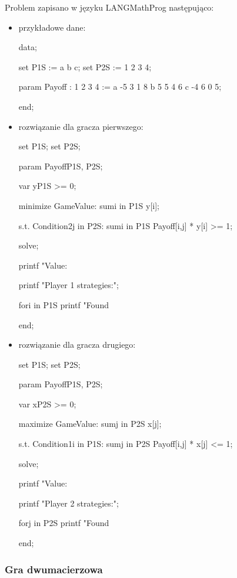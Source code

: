 \documentclass[polish]{standalone}
\begin{document}
Problem zapisano w języku LANG{MathProg} następująco:
\begin{itemize}
\item przykładowe dane:
\begin{code}
data;
 
set P1S := a b c;
set P2S := 1 2 3 4;
 
param Payoff
    :  1  2  3  4 :=
    a  -5 3  1  8
    b  5  5  4  6
    c  -4 6  0  5;
 
end;
\end{code}
\item rozwiązanie dla gracza pierwszego:
\begin{code}
set P1S;
set P2S;
 
param Payoff{P1S, P2S};
 
var y{P1S} >= 0;
 
minimize GameValue: sum{i in P1S} y[i];
 
s.t. Condition2{j in P2S}:
    sum{i in P1S} Payoff[i,j] * y[i] >= 1;
 
solve;
 
printf "Value: %
 
printf "Player 1 strategies:\n";
 
for{i in P1S}
    printf "Found %
 
end;
\end{code}
\item rozwiązanie dla gracza drugiego:
\begin{code}
set P1S;
set P2S;
 
param Payoff{P1S, P2S};
 
var x{P2S} >= 0;
 
maximize GameValue: sum{j in P2S} x[j];
 
s.t. Condition1{i in P1S}:
    sum{j in P2S} Payoff[i,j] * x[j] <= 1;
 
solve;
 
printf "Value: %
 
printf "Player 2 strategies:\n";
 
for{j in P2S}
    printf "Found %
 
end;
\end{code}
\end{itemize}

\subsubsection{Gra dwumacierzowa}
\end{document}
